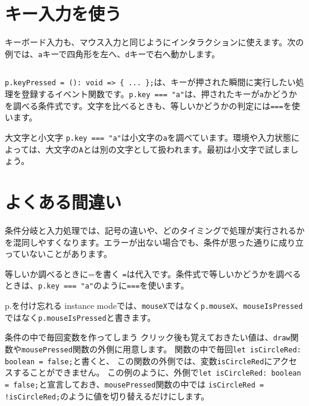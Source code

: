 \section{キー入力を使う}

キーボード入力も、マウス入力と同じようにインタラクションに使えます。次の例では、\texttt{a}キーで四角形を左へ、\texttt{d}キーで右へ動かします。

\begin{listing}[htbp]
\inputminted{ts}{typescript-p5/listings/chapter06/key-pressed-move.ts}
\caption{キー入力で四角形を動かす（\texttt{chapter06/key-pressed-move.ts}）}
\label{lst:chapter06-key-pressed-move}
\end{listing}

\texttt{p.keyPressed = (): void => \{ ... \};}は、キーが押された瞬間に実行したい処理を登録するイベント関数です。\texttt{p.key === "a"}は、押されたキーが\texttt{a}かどうかを調べる条件式です。文字を比べるときも、等しいかどうかの判定には\texttt{===}を使います。

\begin{notebox}{大文字と小文字}
\texttt{p.key === "a"}は小文字の\texttt{a}を調べています。環境や入力状態によっては、大文字の\texttt{A}とは別の文字として扱われます。最初は小文字で試しましょう。
\end{notebox}

\section{よくある間違い}

条件分岐と入力処理では、記号の違いや、どのタイミングで処理が実行されるかを混同しやすくなります。エラーが出ない場合でも、条件が思った通りに成り立っていないことがあります。

\begin{mistakebox}{等しいか調べるときに=を書く}
\texttt{=}は代入です。条件式で等しいかどうかを調べるときは、\texttt{p.key === "a"}のように\texttt{===}を使います。
\end{mistakebox}

\begin{mistakebox}{p.を付け忘れる}
instance modeでは、\texttt{mouseX}ではなく\texttt{p.mouseX}、\texttt{mouseIsPressed}ではなく\texttt{p.mouseIsPressed}と書きます。
\end{mistakebox}

\begin{mistakebox}{条件の中で毎回変数を作ってしまう}
クリック後も覚えておきたい値は、\texttt{draw}関数や\texttt{mousePressed}関数の外側に用意します。
関数の中で毎回\texttt{let isCircleRed: boolean = false;}と書くと、
この関数の外側では、変数\texttt{isCircleRed}にアクセスすることができません。
この例のように、外側で\texttt{let isCircleRed: boolean = false;}と宣言しておき、\texttt{mousePressed}関数の中では
\texttt{isCircleRed = !isCircleRed;}のように値を切り替えるだけにします。
\end{mistakebox}

